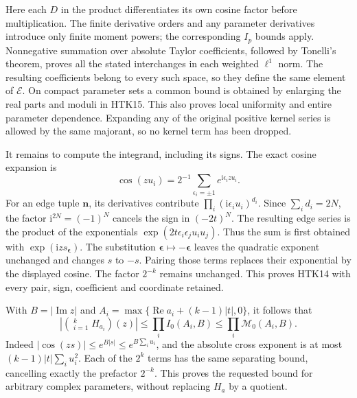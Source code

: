 Here each $D$ in the product differentiates its own cosine
factor before multiplication. The finite derivative orders
and any parameter derivatives introduce only finite moment
powers; the corresponding $I_p$ bounds apply. Nonnegative
summation over absolute Taylor coefficients, followed by
Tonelli's theorem, proves all the stated interchanges in
each weighted $\ell^1$ norm. The resulting coefficients
belong to every such space, so they define the same element
of $\mathcal E$. On compact parameter sets a common bound
is obtained by enlarging the real parts and moduli in HTK15.
This also proves local uniformity and entire parameter
dependence. Expanding any of the original positive kernel
series is allowed by the same majorant, so no kernel term
has been dropped.

It remains to compute the integrand, including its signs.
The exact cosine expansion is
\[
 \cos(zu_i)=2^{-1}\sum_{\epsilon_i=\pm1}e^{\mathrm i\epsilon_i zu_i}.
\]
For an edge tuple $\mathbf n$, its derivatives contribute
$\prod_i(\mathrm i\epsilon_i u_i)^{d_i}$.
Since $\sum_i d_i=2N$, the factor $\mathrm i^{2N}=(-1)^N$
cancels the sign in $(-2t)^N$. The resulting edge series
is the product of the exponentials
$\exp(2t\epsilon_i\epsilon_j u_iu_j)$.
Thus the sum is first obtained with
$\exp(\mathrm i z s_{\boldsymbol\epsilon})$.
The substitution $\boldsymbol\epsilon\mapsto
-\boldsymbol\epsilon$ leaves the quadratic exponent
unchanged and changes $s$ to $-s$. Pairing those terms
replaces their exponential by the displayed cosine.
The factor $2^{-k}$ remains unchanged. This proves HTK14
with every pair, sign, coefficient and coordinate retained.

With $B=|\operatorname{Im}z|$ and
$A_i=\max\{\operatorname{Re}a_i+(k-1)|t|,0\}$, it follows that
\begin{equation}\tag{HTK16}
 \left|\left(\mathop{\star_t}_{i=1}^kH_{a_i}\right)(z)\right|
     \le\prod_i I_0(A_i,B)
     \le\prod_i\mathcal M_0(A_i,B).
\end{equation}
Indeed $|\cos(zs)|\le e^{B|s|}\le e^{B\sum_i u_i}$,
and the absolute cross exponent is at most
$(k-1)|t|\sum_i u_i^2$. Each of the $2^k$ terms has the
same separating bound, cancelling exactly the prefactor
$2^{-k}$. This proves the requested bound for arbitrary
complex parameters, without replacing $H_a$ by a quotient.

